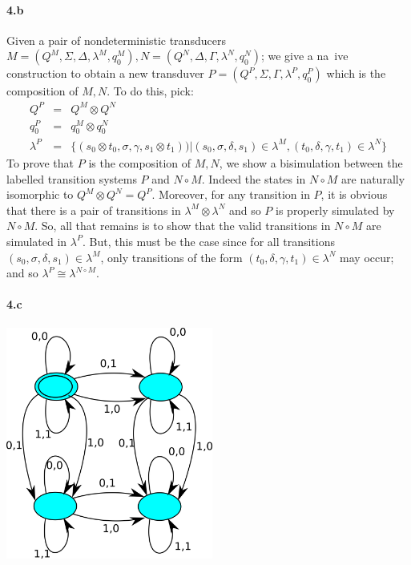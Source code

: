 \documentclass{article}
\begin{document}
\paragraph{4.b}
Given a pair of nondeterministic transducers $M = ( Q^M, \Sigma, \Delta, \lambda^M, q^M_0), N = (Q^N, \Delta, \Gamma, \lambda^N, q^N_0)$; we give a na\
ive construction to obtain a new transduver $P = (Q^P, \Sigma, \Gamma, \lambda^P, q^P_0)$ which is the composition of $M, N$.  To do this, pick:
\begin{eqnarray*}
Q^P & = & Q^M \otimes Q^N \\
q^P_0 & = & q^M_0 \otimes q^N_0 \\
\lambda^P & = & \{ (s_0 \otimes t_0, \sigma, \gamma, s_1 \otimes t_1)) | 
(s_0, \sigma, \delta, s_1) \in \lambda^M, 
(t_0, \delta, \gamma, t_1) \in \lambda^N \}
\end{eqnarray*}
To prove that $P$ is the composition of $M, N$, we show a bisimulation between the labelled transition systems $P$ and $N \circ M$.  Indeed the states in $N \circ M$ are naturally isomorphic to $Q^M \otimes Q^N = Q^P$.  Moreover, for any transition in $P$, it is obvious that there is a pair of transitions in $\lambda^M \otimes \lambda^N$ and so $P$ is properly simulated by $N \circ M$.  So, all that remains is to show that the valid transitions in $N \circ M$ are simulated in $\lambda^P$.  But, this must be the case since for all transitions $(s_0, \sigma, \delta, s_1) \in \lambda^M$, only transitions of the form $(t_0, \delta, \gamma, t_1) \in \lambda^N$ may occur; and so $\lambda^P \cong \lambda^{N \circ M}$.

\paragraph{4.c}
\begin{center}
\includegraphics[height=3in]{ndta2.png}
\end{center}
\end{document}
